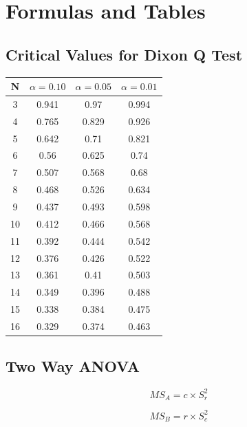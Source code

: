 \documentclass[a4paper,12pt]{article}
\begin{document}
{\begin{itemize}
\begin{itemize}
	\end{itemize}


\end{itemize}
\section*{Formulas and Tables}

\subsection*{Critical Values for Dixon Q Test}


	{
		\Large
		\begin{center}
			\begin{tabular}{|c|c|c|c|}
				\hline  N  & $\alpha=0.10$  & $\alpha=0.05$  & $\alpha=0.01$  \\ \hline
				3  & 0.941 & 0.97  & 0.994 \\ \hline
				4  & 0.765 & 0.829 & 0.926 \\ \hline
				5  & 0.642 & 0.71  & 0.821 \\ \hline
				6  & 0.56  & 0.625 & 0.74  \\ \hline
				7  & 0.507 & 0.568 & 0.68  \\ \hline
				8  & 0.468 & 0.526 & 0.634 \\ \hline
				9  & 0.437 & 0.493 & 0.598 \\ \hline
				10 & 0.412 & 0.466 & 0.568 \\ \hline
				11 & 0.392 & 0.444 & 0.542 \\ \hline
				12 & 0.376 & 0.426 & 0.522 \\ \hline
				13 & 0.361 & 0.41  & 0.503 \\ \hline
				14 & 0.349 & 0.396 & 0.488 \\ \hline
				15 & 0.338 & 0.384 & 0.475 \\ \hline
				16 & 0.329 & 0.374 & 0.463 \\ \hline
			\end{tabular} 
		\end{center}
	}

\subsection*{Two Way ANOVA}
\begin{multicols}{2}
	
\[MS_A = c \times S^2_r\]

\[MS_B = r \times S^2_c\]
\end{multicols}


}
\end{document}
